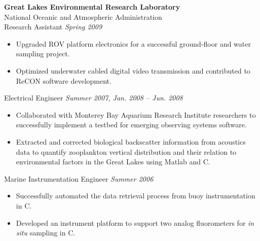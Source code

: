 \documentclass{article}
\begin{document}
{\begin{multicols}{2}
    \textbf{Great Lakes Environmental Research Laboratory}\\
    National Oceanic and Atmospheric Administration\\
    Research Assistant \hfill \textsl{Spring 2009} \\
    \vspace{ -10px}
    \begin{itemize}[noitemsep,nolistsep]
	\item Upgraded ROV platform electronics for a successful ground-floor and water sampling project.
	\item Optimized underwater cabled digital video transmission and contributed to ReCON software development.
    \end{itemize}
    \vspace{5px}
    Electrical Engineer  \hfill \textsl{Summer 2007, Jan. 2008 -- Jun. 2008}  \\
    \vspace{ -10px}	
    \begin{itemize}[noitemsep,nolistsep]
	\item Collaborated with Monterey Bay Aquarium Research Institute researchers to successfully implement a testbed for emerging observing systems software.
	\item Extracted and corrected biological backscatter information from acoustics data to quantify zooplankton vertical distribution and their relation to environmental factors in the Great Lakes using Matlab and C.
    \end{itemize}
    \vspace{5px}
    Marine Instrumentation Engineer \hfill \textsl{Summer 2006} \\
    \vspace{ -10px}	
    \begin{itemize}[noitemsep,nolistsep]
	\item Successfully automated the data retrieval process from buoy instrumentation in C. 
	\item Developed an instrument platform to support two analog fluorometers for \textit{in situ} sampling in C. 
    \end{itemize}
    \vspace{5px}

\end{multicols}}
\end{document}
